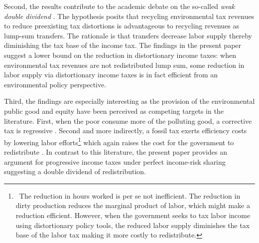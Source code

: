 Second, the results contribute to the academic debate on the so-called \textit{weak double dividend} \citep[for example:][]{LansBovenberg1994EnvironmentalTaxation, LansBovenberg1996OptimalAnalyses}. The hypothesis posits that recycling environmental tax revenues to reduce preexisting tax distortions is advantageous to recycling  revenues as lump-sum transfers. The rationale is that transfers decrease labor supply thereby diminishing the tax base of the income tax. %
The findings in the present paper suggest a lower bound on the reduction in distortionary income taxes: when environmental tax revenues are not redistributed lump sum, some reduction in labor supply via distortionary income taxes is in fact efficient from an environmental policy perspective. %

Third, the findings are especially interesting as the provision of the environmental public good and equity have been perceived as competing targets in the literature. First, when the poor consume more of the polluting good, a corrective tax is regressive \citep{ Fried2018TheGenerations, Sager2019IncomeCurves}. %
Second and more indirectly, a fossil tax exerts efficiency costs by lowering labor efforts\footnote{\ The reduction in hours worked is per se not inefficient. The reduction in dirty production reduces the marginal product of labor, which might make a reduction efficient. However, when the government seeks to tax labor income using distortionary policy tools, the reduced labor supply diminishes the tax base of the labor tax making it more costly to redistribute.} which again raises the cost for the government to redistribute \citep{Dobkowitz2022}. 
In contrast to this literature, the present paper provides an argument for progressive income taxes under perfect income-risk sharing suggesting a double dividend of redistribution. %
